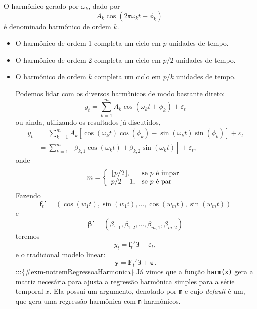 \documentclass[
  letterpaper,
  DIV=11,
  numbers=noendperiod]{scrartcl}
\theoremstyle{definition}
\theoremstyle{definition}
\theoremstyle{plain}
\theoremstyle{plain}
\theoremstyle{remark}
\begin{document}
O harmônico gerado por \(\omega_k\), dado por \begin{equation}
        A_k\cos( 2\pi\omega_k t+\phi_k)
\end{equation} é denominado harmônico de ordem \(k\).

\begin{itemize}
\item
  O harmônico de ordem 1 completa um ciclo em \(p\) unidades de tempo.
\item
  O harmônico de ordem 2 completa um ciclo em \(p/2\) unidades de tempo.
\item
  O harmônico de ordem \(k\) completa um ciclo em \(p/k\) unidades de
  tempo.

  Podemos lidar com os diversos harmônicos de modo bastante direto:
  \begin{equation}
    y_t = \sum_{k=1}^{m }A_k\cos(\omega_k t + \phi_k) + \varepsilon_t
    \end{equation} ou ainda, utilizando os resultados já discutidos,
  \begin{align}
        y_t &= \sum_{k=1}^{m }A_k\left[\cos(\omega_k t)\cos(\phi_k) -\sin(\omega_k t)\sin(\phi_k)\right] + \varepsilon_t\\
        &= \sum_{k=1}^{m }\left[\beta_{k,1}\cos(\omega_k t)+\beta_{k,2}\sin(\omega_k t)\right] + \varepsilon_t,
        \end{align} onde \begin{align}
        m = \left\{\begin{array}{ll}
  \lfloor p/2 \rfloor, & \hbox{se $p$ é ímpar} \\
  p/2-1, & \hbox{se $p$ é par}
        \end{array}\right.
        \end{align} Fazendo \begin{equation}
    \boldsymbol{f}_t'=\left(\cos(w_1 t), \sin(w_1 t),\ldots,\cos(w_{m} t), \sin(w_{m} t) \right)
    \end{equation} e \begin{equation}
    \boldsymbol{\beta}'=\left(\beta_{1,1},\beta_{1,2},\ldots,\beta_{m,1},\beta_{m,2}\right)
    \end{equation} teremos
  \[y_t= \boldsymbol{f}_t'\boldsymbol{\beta} + \varepsilon_t,\] e o
  tradicional modelo linear:
  \[\boldsymbol{y}= \boldsymbol{F}_t'\boldsymbol{\beta} + \boldsymbol{\varepsilon}.\]
  :::\{\#exm-nottemRegressoaHarmonica\} Já vimos que a função
  \texttt{harm(x)} gera a matriz necesária para ajusta a regressão
  harmônica simples para a série temporal \(x\). Ela possui um
  argumento, denotado por \texttt{m} e cujo \emph{default} é um, que
  gera uma regressão harmônica com \texttt{m} harmônicos.
\end{itemize}
\end{document}

